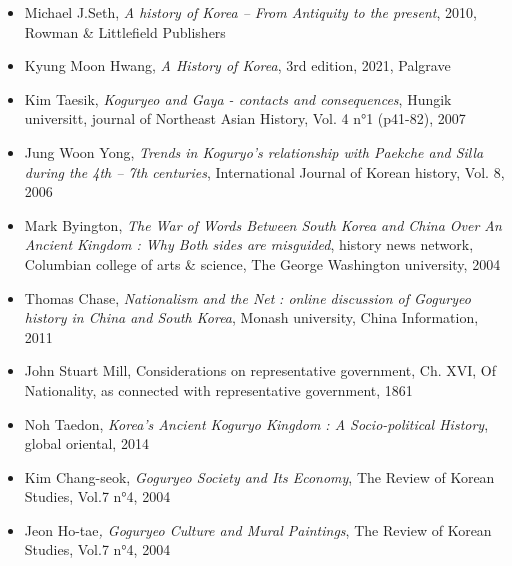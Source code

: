 \documentclass[11pt,a4paper]{article}
\begin{document}
\begin{itemize}[leftmargin=1.3em,itemsep=.18em,topsep=.25em]
\item
  Michael J.Seth, \emph{A history of Korea -- From Antiquity to the present}, 2010, Rowman \& Littlefield Publishers
\item
  Kyung Moon Hwang, \emph{A History of Korea}, 3rd edition, 2021, Palgrave
\item
  Kim Taesik, \emph{Koguryeo and Gaya - contacts and consequences}, Hungik universitt, journal of Northeast Asian History, Vol. 4 n°1 (p41-82), 2007
\item
  Jung Woon Yong, \emph{Trends in Koguryo's relationship with Paekche and Silla during the 4th -- 7th centuries}, International Journal of Korean history, Vol. 8, 2006
\item
  Mark Byington, \emph{The War of Words Between South Korea and China Over An Ancient Kingdom : Why Both sides are misguided}, history news network, Columbian college of arts \& science, The George Washington university, 2004
\item
  Thomas Chase, \emph{Nationalism and the Net} \emph{: online discussion of Goguryeo history in China and South Korea}, Monash university, China Information, 2011
\item
  John Stuart Mill, Considerations on representative government, Ch. XVI, Of Nationality, as connected with representative government, 1861
\item
  Noh Taedon, \emph{Korea's Ancient Koguryo Kingdom : A Socio-political History}, global oriental, 2014
\item
  Kim Chang-seok, \emph{Goguryeo Society and Its Economy}, The Review of Korean Studies, Vol.7 n°4, 2004
\item
  Jeon Ho-tae\emph{, Goguryeo Culture and Mural Paintings}, The Review of Korean Studies, Vol.7 n°4, 2004
\end{itemize}
\end{document}
